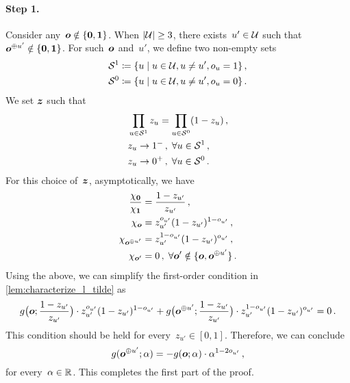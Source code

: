 \begin{proofEnd}
\begin{proofEnd}
        \paragraph{Step 1.}
        Consider any~${\bm{o}} \notin \{{\bm{0}}, {\bm{1}}\}$. When $|{\mathcal{U}}| \ge 3$, there exists~$u' \in {\mathcal{U}}$ such that ${\bm{o}}^{\oplus u'} \notin \{{\bm{0}}, {\bm{1}}\}$. For such~${\bm{o}}$ and~$u'$, we define two non-empty sets
        \begin{align*}
            {\mathcal{S}}^1 &\coloneqq \{u \mid u \in {\mathcal{U}}, u \neq u', o_u = 1\} \,,\\
            {\mathcal{S}}^0 &\coloneqq \{u \mid u \in {\mathcal{U}}, u \neq u', o_u = 0\} \,.
        \end{align*}
        We set ${\bm{z}}$ such that
        \begin{equation}
        \begin{aligned}
        \label{eq:_proof_set_z}
            &\prod_{u \in {\mathcal{S}}^1} z_u = \prod_{u \in {\mathcal{S}}^0} (1 - z_u)
            \,, \\
            &z_u \rightarrow 1^-\,, \;\forall u \in {\mathcal{S}}^1 \,,\\
            &z_u \rightarrow 0^+\,, \;\forall u \in {\mathcal{S}}^0 \,.
        \end{aligned}
        \end{equation}
        For this choice of~${\bm{z}}$, asymptotically, we have
        \begin{align*}
            \frac{\chi_{\bm{0}}}{\chi_{\bm{1}}} &= \frac{1 - z_{u'}}{z_{u'}} \,, \\
            \chi_{\bm{o}} &= z_{u'}^{o_{u'}} (1 - z_{u'})^{1 - o_{u'}} \,, \\
            \chi_{{\bm{o}}^{\oplus u'}} &= z_{u'}^{1 - o_{u'}} (1 - z_{u'})^{o_{u'}} \,, \\
            \chi_{{\bm{o}}'} &= 0 \,, \; \forall {\bm{o}}' \notin \{{\bm{o}}, {\bm{o}}^{\oplus u'}\} \,.
        \end{align*}
        Using the above, we can simplify the first-order condition in \cref{lem:characterize_l_tilde} as
        \begin{equation*}
            g\big({\bm{o}}; \frac{1 - z_{u'}}{z_{u'}}\big) \cdot z_{u'}^{o_{u'}} (1 - z_{u'})^{1-o_{u'}} 
            + g\big({\bm{o}}^{\oplus u'}; \frac{1 - z_{u'}}{z_{u'}}\big) \cdot z_{u'}^{1 - o_{u'}} (1 - z_{u'})^{o_{u'}}  = 0
            \,.
        \end{equation*}
        This condition should be held for every~$z_{u'} \in [0, 1]$. Therefore, we can conclude
        \begin{equation}
        \label{eq:_proof_g_one_bit_flipped}
            g({\bm{o}}^{\oplus u'}; \alpha) = - g({\bm{o}}; \alpha) \cdot \alpha^{1-2 o_{u'}}
            \,,
        \end{equation}
        for every~$\alpha \in \mathbb{R}$. This completes the first part of the proof.
    

\end{proofEnd}
\end{proofEnd}
